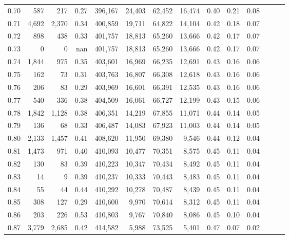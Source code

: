\begin{tabular}{rrrrrrrrrrrrrr}
0.70 &     587 &    217 &  0.27 &  396,167 &   24,403 &  62,452 &  16,474 &  0.40 &  0.21 &      0.08 \\
0.71 &   4,692 &  2,370 &  0.34 &  400,859 &   19,711 &  64,822 &  14,104 &  0.42 &  0.18 &      0.07 \\
0.72 &     898 &    438 &  0.33 &  401,757 &   18,813 &  65,260 &  13,666 &  0.42 &  0.17 &      0.07 \\
0.73 &       0 &      0 &   nan &  401,757 &   18,813 &  65,260 &  13,666 &  0.42 &  0.17 &      0.07 \\
0.74 &   1,844 &    975 &  0.35 &  403,601 &   16,969 &  66,235 &  12,691 &  0.43 &  0.16 &      0.06 \\
0.75 &     162 &     73 &  0.31 &  403,763 &   16,807 &  66,308 &  12,618 &  0.43 &  0.16 &      0.06 \\
0.76 &     206 &     83 &  0.29 &  403,969 &   16,601 &  66,391 &  12,535 &  0.43 &  0.16 &      0.06 \\
0.77 &     540 &    336 &  0.38 &  404,509 &   16,061 &  66,727 &  12,199 &  0.43 &  0.15 &      0.06 \\
0.78 &   1,842 &  1,128 &  0.38 &  406,351 &   14,219 &  67,855 &  11,071 &  0.44 &  0.14 &      0.05 \\
0.79 &     136 &     68 &  0.33 &  406,487 &   14,083 &  67,923 &  11,003 &  0.44 &  0.14 &      0.05 \\
0.80 &   2,133 &  1,457 &  0.41 &  408,620 &   11,950 &  69,380 &   9,546 &  0.44 &  0.12 &      0.04 \\
0.81 &   1,473 &    971 &  0.40 &  410,093 &   10,477 &  70,351 &   8,575 &  0.45 &  0.11 &      0.04 \\
0.82 &     130 &     83 &  0.39 &  410,223 &   10,347 &  70,434 &   8,492 &  0.45 &  0.11 &      0.04 \\
0.83 &      14 &      9 &  0.39 &  410,237 &   10,333 &  70,443 &   8,483 &  0.45 &  0.11 &      0.04 \\
0.84 &      55 &     44 &  0.44 &  410,292 &   10,278 &  70,487 &   8,439 &  0.45 &  0.11 &      0.04 \\
0.85 &     308 &    127 &  0.29 &  410,600 &    9,970 &  70,614 &   8,312 &  0.45 &  0.11 &      0.04 \\
0.86 &     203 &    226 &  0.53 &  410,803 &    9,767 &  70,840 &   8,086 &  0.45 &  0.10 &      0.04 \\
0.87 &   3,779 &  2,685 &  0.42 &  414,582 &    5,988 &  73,525 &   5,401 &  0.47 &  0.07 &      0.02 \\

\end{tabular}
